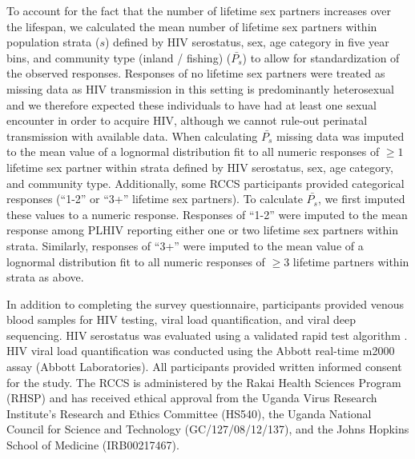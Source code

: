 \documentclass[10pt,letterpaper]{article}
\begin{document}
To account for the fact that the number of lifetime sex partners increases over the lifespan, we calculated the mean number of lifetime sex partners within population strata ($s$) defined by HIV serostatus, sex, age category in five year bins, and community type (inland / fishing) ($\bar{P_s}$) to allow for standardization of the observed responses. Responses of no lifetime sex partners were treated as missing data as HIV transmission in this setting is predominantly heterosexual \cite{ugandaAIDS2012} and we therefore expected these individuals to have had at least one sexual encounter in order to acquire HIV, although we cannot rule-out perinatal transmission with available data. When calculating $\bar{P_s}$ missing data was imputed to the mean value of a lognormal distribution fit to all numeric responses of $\ge1$ lifetime sex partner within strata defined by HIV serostatus, sex, age category, and community type. Additionally, some RCCS participants provided categorical responses (``1-2'' or ``3+'' lifetime sex partners). To calculate $\bar{P_s}$, we first imputed these values to a numeric response. Responses of ``1-2'' were imputed to the mean response among PLHIV reporting either one or two lifetime sex partners within strata. Similarly, responses of ``3+'' were imputed to the mean value of a lognormal distribution fit to all numeric responses of $\ge3$ lifetime partners within strata as above. 

In addition to completing the survey questionnaire, participants provided venous blood samples for HIV testing, viral load quantification, and viral deep sequencing. HIV serostatus was evaluated using a validated rapid test algorithm \cite{kagulire2011}. HIV viral load quantification was conducted using the Abbott real-time m2000 assay (Abbott Laboratories). All participants provided written informed consent for the study. The RCCS is administered by the Rakai Health Sciences Program (RHSP) and has received ethical approval from the Uganda Virus Research Institute’s Research and Ethics Committee (HS540), the Uganda National Council for Science and Technology (GC/127/08/12/137), and the Johns Hopkins School of Medicine (IRB00217467).  
\end{document}
